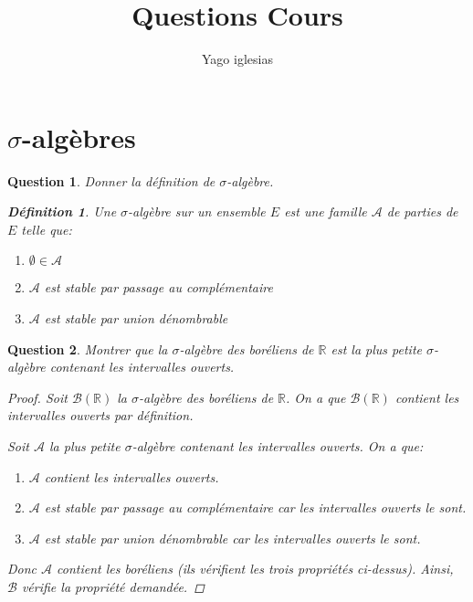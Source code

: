 \documentclass{article}
\theoremstyle{plain}
\newtheorem{question}{Question}
\theoremstyle{definition}
\newtheorem{definition}{Définition}
\begin{document}

\title{Questions Cours}
\author{Yago iglesias}
\maketitle
\tableofcontents


\section{$\sigma$-algèbres}

\begin{question}
	Donner la définition de $\sigma$-algèbre.
	\begin{definition}
		Une $\sigma$-algèbre sur un ensemble $E$ est une famille $\mathscr{A}$ de parties de $E$ telle que:
		\begin{enumerate}
			\item $\emptyset \in \mathscr{A}$
			\item $\mathscr{A}$ est stable par passage au complémentaire
			\item $\mathscr{A}$ est stable par union dénombrable
		\end{enumerate}
	\end{definition}
\end{question}

\begin{question}
	Montrer que la $\sigma$-algèbre des boréliens de $\mathbb{R}$ est la plus petite $\sigma$-algèbre contenant les intervalles ouverts.

	\begin{proof}
		Soit $\mathscr{B} (\mathbb{R})$ la $\sigma$-algèbre des boréliens de $\mathbb{R}$. On a que
		$\mathscr{B} (\mathbb{R})$ contient les intervalles ouverts par définition.

		Soit $\mathscr{A}$ la plus petite $\sigma$-algèbre contenant les intervalles ouverts. On a que:
		\begin{enumerate}
			\item $\mathscr{A}$ contient les intervalles ouverts.
			\item $\mathscr{A}$ est stable par passage au complémentaire car les intervalles ouverts le sont.
			\item $\mathscr{A}$ est stable par union dénombrable car les intervalles ouverts le sont.
		\end{enumerate}
		Donc $\mathscr{A}$ contient les boréliens (ils vérifient les trois propriétés ci-dessus).
		Ainsi, $\mathscr{B}$ vérifie la propriété demandée.
	\end{proof}
\end{question}
\end{document}
